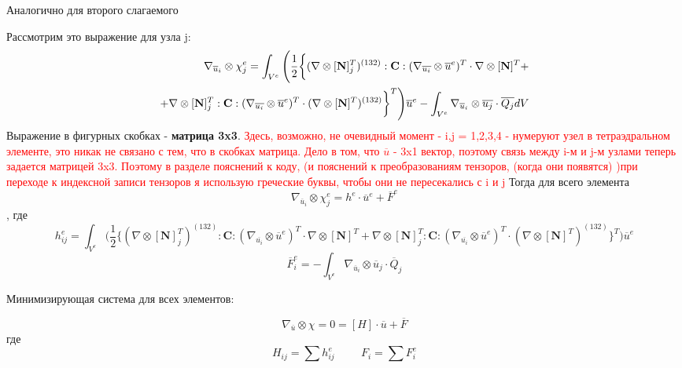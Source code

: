 \documentclass[a4paper,12pt]{article}
\begin{document}
Аналогично для второго слагаемого \par
Рассмотрим это выражение для узла j:
\begin{equation}
    \begin{split}
        \nabla_{\overline{u}_i} \otimes \chi^e_j =  \int_{V^e} \Bigg(\frac{1}{2} \bigg\{ (\nabla \otimes[\textbf{N}]_j^T)^{(132)} :\textbf{C}: (\nabla_{\overline{u_i}} \otimes \overline{u}^e)^T \cdot \nabla \otimes [\textbf{N}]^T + \\
        + \nabla \otimes [\textbf{N}]_j^T:\textbf{C}:(\nabla_{\overline{u_i}} \otimes \overline{u}^e)^T \cdot (\nabla \otimes [\textbf{N}]^T)^{(132)} \bigg\}^T \Bigg) \overline{u}^e - \int_{V^e}\nabla_{\overline{u}_i} \otimes\overline{u_j} \cdot \overline{Q_j} \space dV 
    \end{split}
\end{equation}
Выражение в фигурных скобках - \textbf{матрица 3x3}. \textcolor{red}{Здесь, возможно, не очевидный момент - i,j = {1,2,3,4} - нумеруют узел в тетраэдральном элементе, это никак не связано с тем, что в скобках матрица. Дело в том, что $\overline{u}$ - 3x1 вектор, поэтому связь между i-м и j-м узлами теперь задается матрицей 3x3. Поэтому в разделе пояснений к коду, (и пояснений к преобразованиям тензоров, (когда они появятся) )при переходе к индексной записи тензоров я использую греческие буквы, чтобы они не пересекались с i и j}
Тогда для всего элемента
\begin{equation}
    \nabla_{\overline{u}_i} \otimes \chi^e_j = h^e \cdot \overline{u}^e + \overline{F}^e
\end{equation},
где
\begin{equation}
    h_{ij}^e = \int_{V^e} \Bigg(\frac{1}{2} \bigg\{ (\nabla \otimes[\textbf{N}]_j^T)^{(132)} :\textbf{C}: (\nabla_{\overline{u_i}} \otimes \overline{u}^e)^T \cdot \nabla \otimes [\textbf{N}]^T 
        + \nabla \otimes [\textbf{N}]_j^T:\textbf{C}:(\nabla_{\overline{u_i}} \otimes \overline{u}^e)^T \cdot (\nabla \otimes [\textbf{N}]^T)^{(132)} \bigg\}^T \Bigg) \overline{u}^e
\end{equation}
\begin{equation}
    \overline{F}^e_i = - \int_{V^e}\nabla_{\overline{u}_i} \otimes\overline{u}_j \cdot \overline{Q}_j
\end{equation}

Минимизирующая система для всех элементов:

\begin{equation}
    \nabla_{\overline{u}} \otimes \chi = 0 =[H] \cdot \overline{u} +  \overline{F}
\end{equation}
где 
\begin{equation}
    H_{ij} = \sum h_{ij}^e  \hspace{1cm} F_i = \sum F_i^e
\end{equation}
\end{document}
